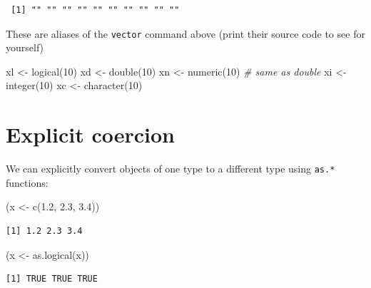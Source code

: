 \documentclass[
]{book}
\newenvironment{Shaded}{\begin{snugshade}}{\end{snugshade}}
\newcommand{\CommentTok}[1]{\textcolor[rgb]{0.56,0.35,0.01}{\textit{#1}}}
\newcommand{\DecValTok}[1]{\textcolor[rgb]{0.00,0.00,0.81}{#1}}
\newcommand{\FloatTok}[1]{\textcolor[rgb]{0.00,0.00,0.81}{#1}}
\newcommand{\FunctionTok}[1]{\textcolor[rgb]{0.00,0.00,0.00}{#1}}
\newcommand{\NormalTok}[1]{#1}
\newcommand{\OtherTok}[1]{\textcolor[rgb]{0.56,0.35,0.01}{#1}}
\begin{document}
\begin{verbatim}
 [1] "" "" "" "" "" "" "" "" "" ""
\end{verbatim}

These are aliases of the \texttt{vector} command above (print their source code to see for yourself)

\begin{Shaded}
\begin{Highlighting}[]
\NormalTok{xl }\OtherTok{\textless{}{-}} \FunctionTok{logical}\NormalTok{(}\DecValTok{10}\NormalTok{)}
\NormalTok{xd }\OtherTok{\textless{}{-}} \FunctionTok{double}\NormalTok{(}\DecValTok{10}\NormalTok{)}
\NormalTok{xn }\OtherTok{\textless{}{-}} \FunctionTok{numeric}\NormalTok{(}\DecValTok{10}\NormalTok{) }\CommentTok{\# same as double}
\NormalTok{xi }\OtherTok{\textless{}{-}} \FunctionTok{integer}\NormalTok{(}\DecValTok{10}\NormalTok{)}
\NormalTok{xc }\OtherTok{\textless{}{-}} \FunctionTok{character}\NormalTok{(}\DecValTok{10}\NormalTok{)}
\end{Highlighting}
\end{Shaded}

\hypertarget{explicit-coercion}{%
\section{Explicit coercion}\label{explicit-coercion}}

We can explicitly convert objects of one type to a different type using \texttt{as.*} functions:

\begin{Shaded}
\begin{Highlighting}[]
\NormalTok{(x }\OtherTok{\textless{}{-}} \FunctionTok{c}\NormalTok{(}\FloatTok{1.2}\NormalTok{, }\FloatTok{2.3}\NormalTok{, }\FloatTok{3.4}\NormalTok{))}
\end{Highlighting}
\end{Shaded}

\begin{verbatim}
[1] 1.2 2.3 3.4
\end{verbatim}

\begin{Shaded}
\begin{Highlighting}[]
\NormalTok{(x }\OtherTok{\textless{}{-}} \FunctionTok{as.logical}\NormalTok{(x))}
\end{Highlighting}
\end{Shaded}

\begin{verbatim}
[1] TRUE TRUE TRUE
\end{verbatim}
\end{document}
